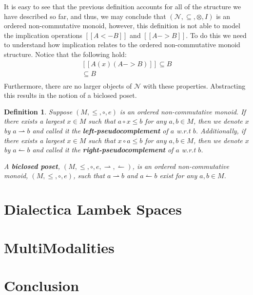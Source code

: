 \documentclass{article}
\newcommand{\N}{\mathcal{N}}
\newcommand{\rto}{\leftharpoonup}
\newcommand{\lto}{\rightharpoonup}
\newtheorem{definition}[theorem]{Definition}
\begin{document}
It is easy to see that the previous definition accounts for all of the
structure we have described so far, and thus, we may conclude that
$(\N, \subseteq, \otimes, I)$ is an ordered non-commutative monoid,
however, this definition is not able to model the implication
operations $[[A <- B]]$ and $[[A -> B]]$.  To do this we need to
understand how implication relates to the ordered non-commutative
monoid structure.  Notice that the following hold:
\[
\begin{array}{lll}
  [[A (x) (A -> B)]] \subseteq B\\
  [[(A <- B) (x) A]] \subseteq B\\
\end{array}
\]
Furthermore, there are no larger objects of $\N$ with these
properties.  Abstracting this results in the notion of a biclosed
poset.
\begin{definition}
  \label{def:biclosed-poset}
  Suppose $(M, \leq, \circ, e)$ is an ordered non-commutative monoid.
  If there exists a largest $x \in M$ such that $a \circ x \leq b$ for
  any $a, b \in M$, then we denote $x$ by $a \lto b$ and called it
  the \textbf{left-pseudocomplement} of $a$ w.r.t $b$.  Additionally,
  if there exists a largest $x \in M$ such that $x \circ a \leq b$ for
  any $a, b \in M$, then we denote $x$ by $a \rto b$ and called it
  the \textbf{right-pseudocomplement} of $a$ w.r.t $b$.

  A \textbf{biclosed poset}, $(M, \leq, \circ, e, \lto, \rto)$, is an
  ordered non-commutative monoid, $(M, \leq, \circ, e)$, such that $a
  \lto b$ and $a \rto b$ exist for any $a,b \in M$.
\end{definition}

\section{Dialectica Lambek Spaces}

\section{MultiModalities}
\section{Conclusion}



\end{document}
